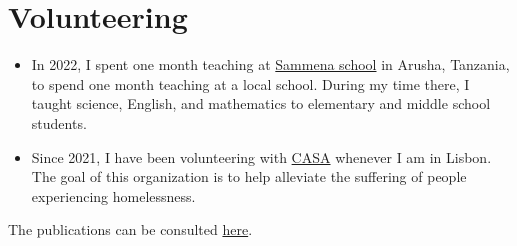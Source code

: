 \documentclass[a4paper,11pt]{article}
\newcommand{\optExtraSpace}{}
\newcommand{\sectionVolunteering}{
      \vspace{15pt}

      \section{Volunteering}

      \vspace{4pt}
      \begin{itemize}
      \item In 2022, I spent one month teaching at \href{https://www.facebook.com/people/Charity-sammena-school-and-orphanage/100068066163936/}{Sammena school} in Arusha, Tanzania, to spend one month teaching at a local school. During my time there, I taught science, English, and mathematics to elementary and middle school students.
      \item Since 2021, I have been volunteering with \href{https://www.casa-apoioaosemabrigo.org/casa-a-associacao/}{CASA} whenever I am in Lisbon. The goal of this organization is to help alleviate the suffering of people experiencing homelessness. 
      \end{itemize}
    }
\newcommand{\optExtraSpace}{\vspace{5pt}}
\newcommand{\sectionVolunteering}{}
\begin{document}
    \sectionVolunteering

      









  \newpage

  The publications can be consulted \href{https://joaquimcampos.com/pubs.html}{here}. \\[5pt]

  \begin{bibunit}
    \renewcommand\refname{Publications: Science}

    \nocite{
      goujonStableParameterizationContinuous2023,
      aziznejadMeasuringComplexityLearning2023,
      camposLearningContinuousPiecewiseLinear2022,
      bohraLearningActivationFunctions2020,
      aziznejadDeepNeuralNetworks2020,
      djelouahNeuralInterFrameCompression2019,
      camposContentAdaptiveOptimization2019}

  \end{bibunit}

  \vspace{15pt}
  \optExtraSpace
\end{document}
